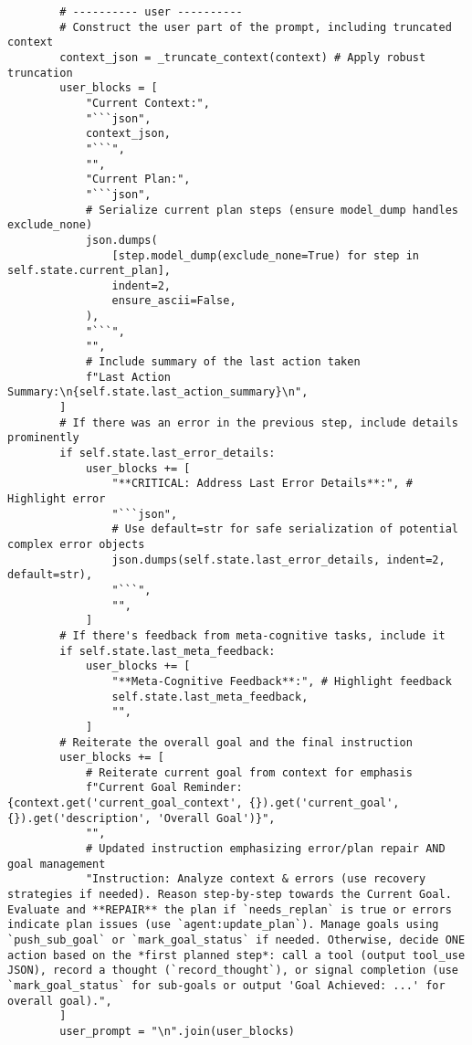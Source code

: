 \documentclass[12pt,a4paper]{article}
\begin{document}
\begin{pageablecode}
\begin{verbatim}
        # ---------- user ----------
        # Construct the user part of the prompt, including truncated context
        context_json = _truncate_context(context) # Apply robust truncation
        user_blocks = [
            "Current Context:",
            "```json",
            context_json,
            "```",
            "",
            "Current Plan:",
            "```json",
            # Serialize current plan steps (ensure model_dump handles exclude_none)
            json.dumps(
                [step.model_dump(exclude_none=True) for step in self.state.current_plan],
                indent=2,
                ensure_ascii=False,
            ),
            "```",
            "",
            # Include summary of the last action taken
            f"Last Action Summary:\n{self.state.last_action_summary}\n",
        ]
        # If there was an error in the previous step, include details prominently
        if self.state.last_error_details:
            user_blocks += [
                "**CRITICAL: Address Last Error Details**:", # Highlight error
                "```json",
                # Use default=str for safe serialization of potential complex error objects
                json.dumps(self.state.last_error_details, indent=2, default=str),
                "```",
                "",
            ]
        # If there's feedback from meta-cognitive tasks, include it
        if self.state.last_meta_feedback:
            user_blocks += [
                "**Meta-Cognitive Feedback**:", # Highlight feedback
                self.state.last_meta_feedback,
                "",
            ]
        # Reiterate the overall goal and the final instruction
        user_blocks += [
            # Reiterate current goal from context for emphasis
            f"Current Goal Reminder: {context.get('current_goal_context', {}).get('current_goal', {}).get('description', 'Overall Goal')}",
            "",
            # Updated instruction emphasizing error/plan repair AND goal management
            "Instruction: Analyze context & errors (use recovery strategies if needed). Reason step-by-step towards the Current Goal. Evaluate and **REPAIR** the plan if `needs_replan` is true or errors indicate plan issues (use `agent:update_plan`). Manage goals using `push_sub_goal` or `mark_goal_status` if needed. Otherwise, decide ONE action based on the *first planned step*: call a tool (output tool_use JSON), record a thought (`record_thought`), or signal completion (use `mark_goal_status` for sub-goals or output 'Goal Achieved: ...' for overall goal).",
        ]
        user_prompt = "\n".join(user_blocks)


\end{verbatim}
\end{pageablecode}
\end{document}
